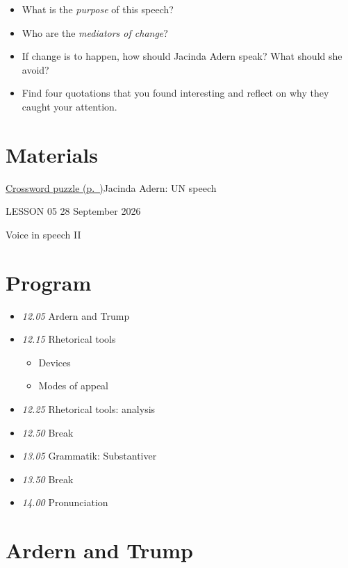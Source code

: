 \documentclass[11pt,a4paper,oneside]{book}
\begin{document}
\begin{itemize}
\item What is the \emph{purpose} of this speech?
\item Who are the \emph{mediators of change}?
\item If change is to happen, how should Jacinda Adern speak? What should she avoid?
\item Find four quotations that you found interesting and reflect on why they caught your attention.
\end{itemize}

\section*{Materials}
\hyperref[worksheet-13]{Crossword puzzle (p.~\pageref*{worksheet-13})}Jacinda Adern: UN speech


\clearpage{}
{\color{blue}\small LESSON 05 \hfill 28 September 2026\par}
\vspace{4mm}
{\displayfont\color{navy}\fontsize{30}{34}\selectfont Voice in speech II\par}\vspace{4mm}

\section*{Program}

\begin{itemize}
\item \emph{12.05} Ardern and Trump
\item \emph{12.15} Rhetorical tools

\begin{itemize}
\item Devices
\item Modes of appeal
\end{itemize}

\item \emph{12.25} Rhetorical tools: analysis
\item \emph{12.50} Break
\item \emph{13.05} Grammatik: Substantiver
\item \emph{13.50} Break
\item \emph{14.00} Pronunciation
\end{itemize}

\section*{Ardern and Trump}
\end{document}
